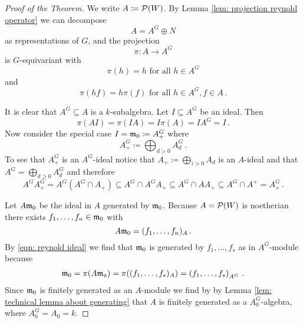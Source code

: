 \begin{proof}[Proof of the Theorem]
  We write $A \coloneqq \mathcal{P}(W)$. By Lemma \ref{lem: projection reynold operator} we can decompose
  \[
      A
    = A^G \oplus N
  \]
  as representations of $G$, and the projection
  \[
            \pi
    \colon  A
    \to     A^G
  \]
  is $G$-equivariant with
  \[
     \pi(h)
    = h
    \text{ for all }
    h \in A^G
  \]
  and
  \[
      \pi(hf)
    = h\pi(f)
    \text{ for all }
    h \in A^G,
    f \in A \,.
  \]
  
  It is clear that $A^G \subseteq A$ is a $k$-subalgebra.
  Let $I \subseteq A^G$ be an ideal. Then
  \begin{equation}\label{eqn: reynold ideal}
      \pi(A I)
    = \pi(I A)
    = I \pi(A)
    = I A^G
    = I \,.
  \end{equation}
  Now consider the special case $I = \mathfrak{m}_0 \coloneqq A^G_+$ where
  \[
              A^G_+
    \coloneqq \bigoplus_{d > 0} A^G_d \,.
  \]
  To see that $A^G_+$ is an $A^G$-ideal notice that $A_+ \coloneqq \bigoplus_{i > 0} A_d$ is an $A$-ideal and that $A^G = \bigoplus_{d \geq 0} A^G_d$ and therefore
  \[
              A^G A^G_+
    =         A^G \left( A^G \cap A_+ \right)
    \subseteq A^G \cap A^G A_+
    \subseteq A^G \cap A A_+
    \subseteq A^G \cap A^+
    =         A^G_+ \,.
  \]
  
  Let $A \mathfrak{m}_0$ be the ideal in $A$ generated by $\mathfrak{m}_0$.
  Because $A = \mathcal{P}(W)$ is noetherian there exists $f_1, \dotsc, f_n \in \mathfrak{m}_0$ with
  \[
      A \mathfrak{m}_0
    = (f_1, \dotsc, f_n)_A \,.
  \]
  By \eqref{eqn: reynold ideal} we find that $\mathfrak{m}_0$ is generated by $f_1, \dotsc, f_s$ as in $A^G$-module because
  \begin{align*}
      \mathfrak{m}_0
    = \pi(A \mathfrak{m_0})
    = \pi( (f_1, \dotsc, f_s)_A )
    = \left( f_1, \dotsc, f_s \right)_{A^G} \,.
  \end{align*}
  Since $\mathfrak{m}_0$ is finitely generated as an $A$-module we find by by Lemma \ref{lem: technical lemma about generating} that $A$ is finitely generated as a $A_0^G$-algebra, where $A_0^G = A_0 = k$.
\end{proof}




